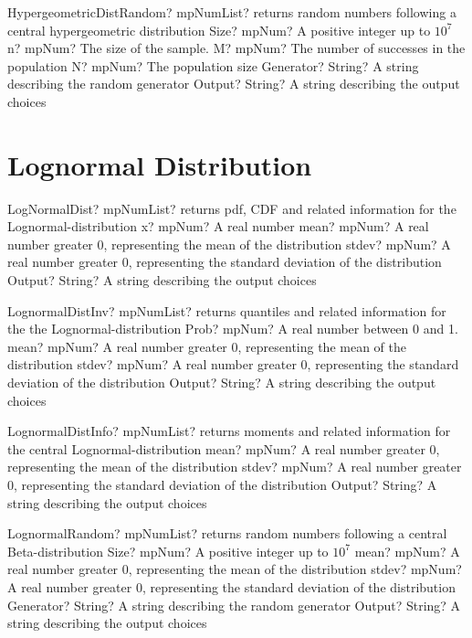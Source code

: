\documentclass[12pt,a4paper,openany]{book}
\begin{document}
\begin{mpFunctionsExtract}
\mpFunctionSix
{HypergeometricDistRandom? mpNumList? returns random numbers following a central hypergeometric distribution}
{Size? mpNum? A positive integer up to $10^7$}
{n? mpNum? The size of the sample.}
{M? mpNum? The number of successes in the population}
{N? mpNum? The population size}
{Generator? String? A string describing the random generator}
{Output? String? A string describing the output choices}
\end{mpFunctionsExtract}

\section{Lognormal Distribution}

\begin{mpFunctionsExtract}
\mpFunctionFour
{LogNormalDist? mpNumList? returns pdf, CDF and related information for the Lognormal-distribution}
{x? mpNum? A real number}
{mean? mpNum? A real number greater 0, representing the mean of the distribution}
{stdev? mpNum? A real number greater 0, representing the standard deviation of the distribution}
{Output? String? A string describing the output choices}
\end{mpFunctionsExtract}

\begin{mpFunctionsExtract}
\mpFunctionFour
{LognormalDistInv? mpNumList? returns quantiles and related information for the the Lognormal-distribution}
{Prob? mpNum? A real number between 0 and 1.}
{mean? mpNum? A real number greater 0, representing the mean of the distribution}
{stdev? mpNum? A real number greater 0, representing the standard deviation of the distribution}
{Output? String? A string describing the output choices}
\end{mpFunctionsExtract}

\begin{mpFunctionsExtract}
\mpFunctionThree
{LognormalDistInfo? mpNumList? returns moments and related information for the central Lognormal-distribution}
{mean? mpNum? A real number greater 0, representing the mean of the distribution}
{stdev? mpNum? A real number greater 0, representing the standard deviation of the distribution}
{Output? String? A string describing the output choices}
\end{mpFunctionsExtract}

\begin{mpFunctionsExtract}
\mpFunctionFive
{LognormalRandom? mpNumList? returns random numbers following a central Beta-distribution}
{Size? mpNum? A positive integer up to $10^7$}
{mean? mpNum? A real number greater 0, representing the mean of the distribution}
{stdev? mpNum? A real number greater 0, representing the standard deviation of the distribution}
{Generator? String? A string describing the random generator}
{Output? String? A string describing the output choices}
\end{mpFunctionsExtract}
\end{document}
